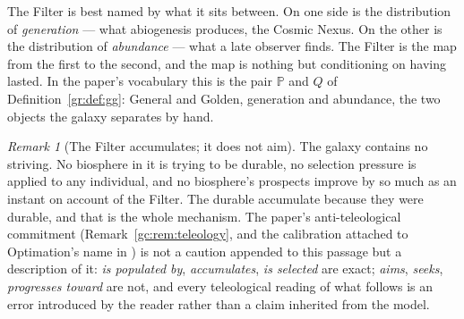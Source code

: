 \documentclass[11pt]{article}
\numberwithin{equation}{section}
\theoremstyle{plain}
\theoremstyle{definition}
\theoremstyle{remark}
\newtheorem{remark}[theorem]{Remark}
\newcommand{\PP}{\mathbb{P}}
\begin{document}
The Filter is best named by what it sits between. On one side is the distribution of \emph{generation} --- what abiogenesis produces, the Cosmic Nexus. On the other is the distribution of \emph{abundance} --- what a late observer finds. The Filter is the map from the first to the second, and the map is nothing but conditioning on having lasted. In the paper's vocabulary this is the pair $\PP$ and $Q$ of Definition~\ref{gr:def:gg}: General and Golden, generation and abundance, the two objects the galaxy separates by hand.

\begin{remark}[The Filter accumulates; it does not aim]\label{ac:rem:noaim}
The galaxy contains no striving. No biosphere in it is trying to be durable, no selection pressure is applied to any individual, and no biosphere's prospects improve by so much as an instant on account of the Filter. The durable accumulate because they were durable, and that is the whole mechanism. The paper's anti-teleological commitment (Remark~\ref{gc:rem:teleology}, and the calibration attached to Optimation's name in \cite{Nexus}) is not a caution appended to this passage but a description of it: \emph{is populated by}, \emph{accumulates}, \emph{is selected} are exact; \emph{aims}, \emph{seeks}, \emph{progresses toward} are not, and every teleological reading of what follows is an error introduced by the reader rather than a claim inherited from the model.
\end{remark}
\end{document}
